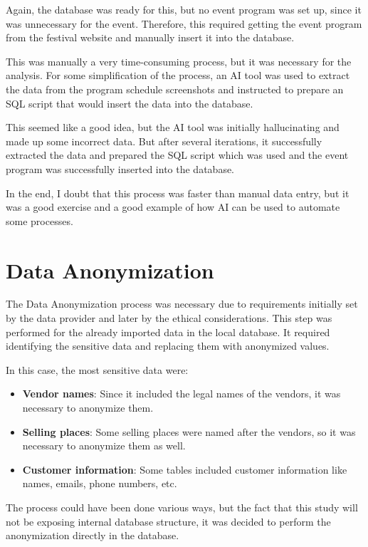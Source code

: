 Again, the database was ready for this, but no event program was set up, since it was unnecessary for the event.
Therefore, this required getting the event program from the festival website and manually insert it into the database.

This was manually a very time-consuming process, but it was necessary for the analysis.
For some simplification of the process, an AI tool was used to extract the data from the program schedule screenshots and instructed to prepare an SQL script that would insert the data into the database.

This seemed like a good idea, but the AI tool was initially hallucinating and made up some incorrect data.
But after several iterations, it successfully extracted the data and prepared the SQL script which was used and the event program was successfully inserted into the database.

In the end, I doubt that this process was faster than manual data entry, but it was a good exercise and a good example of how AI can be used to automate some processes.


\section{Data Anonymization}
\label{sec:data-methodology-anonymization}
The Data Anonymization process was necessary due to requirements initially set by the data provider and later by the ethical considerations.
This step was performed for the already imported data in the local database.
It required identifying the sensitive data and replacing them with anonymized values.

In this case, the most sensitive data were:
\begin{itemize}
	\item \textbf{Vendor names}: Since it included the legal names of the vendors, it was necessary to anonymize them.
	\item \textbf{Selling places}: Some selling places were named after the vendors, so it was necessary to anonymize them as well.
	\item \textbf{Customer information}: Some tables included customer information like names, emails, phone numbers, etc.
\end{itemize}

The process could have been done various ways, but the fact that this study will not be exposing internal database structure, it was decided to perform the anonymization directly in the database.

